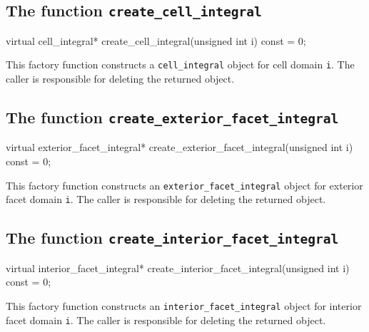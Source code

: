 \subsection{The function \texttt{create\_cell\_integral}}

\begin{code}
virtual cell_integral*
create_cell_integral(unsigned int i) const = 0;
\end{code}

This factory function constructs a \texttt{cell\_integral} object for
cell domain \texttt{i}. The caller is responsible for deleting the
returned object.

\subsection{The function \texttt{create\_exterior\_facet\_integral}}

\begin{code}
virtual exterior_facet_integral*
create_exterior_facet_integral(unsigned int i) const = 0;
\end{code}

This factory function constructs an \texttt{exterior\_facet\_integral}
object for exterior facet domain \texttt{i}. The caller is responsible
for deleting the returned object.

\subsection{The function \texttt{create\_interior\_facet\_integral}}

\begin{code}
virtual interior_facet_integral*
create_interior_facet_integral(unsigned int i) const = 0;
\end{code}

This factory function constructs an \texttt{interior\_facet\_integral}
object for interior facet domain \texttt{i}. The caller is responsible
for deleting the returned object.
